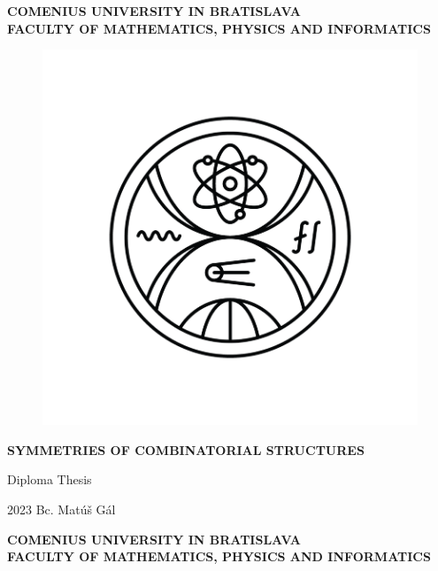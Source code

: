 \documentclass[12pt, a4paper, oneside]{book}
\numberwithin{definition}{chapter}
\numberwithin{theorem}{chapter}
\newcommand\mftitle{Symmetries of Combinatorial Structures}
\newcommand\mfthesistype{Diploma Thesis}
\newcommand\mfauthor{Bc. Matúš Gál}
\newcommand\mfuniversity{COMENIUS UNIVERSITY IN BRATISLAVA}
\newcommand\mffaculty{FACULTY OF MATHEMATICS, PHYSICS AND INFORMATICS}
\begin{document}
\frontmatter

\thispagestyle{empty}

\noindent
\begin{minipage}{\textwidth}
\begin{center}
\textbf{\mfuniversity \\
\mffaculty}
\end{center}
\end{minipage}

\vfill
\begin{figure}[!hbt]
\begin{center}
\includegraphics{images/new_logo}
\end{center}
\end{figure}
\begin{center}
\begin{minipage}{0.8\textwidth}
\centerline{\textbf{\Large\MakeUppercase{\mftitle}}}
\smallskip
\centerline{\mfthesistype}
\end{minipage}
\end{center}
\vfill
2023 \hfill
\mfauthor
\eject

\thispagestyle{empty}

\noindent
\begin{minipage}{\textwidth}
\begin{center}
\textbf{\mfuniversity \\
\mffaculty}
\end{center}
\end{minipage}
\end{document}
